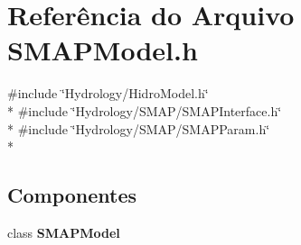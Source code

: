 \section{Referência do Arquivo S\+M\+A\+P\+Model.\+h}
\label{_s_m_a_p_model_8h}
{\ttfamily \#include \char`\"{}Hydrology/\+Hidro\+Model.\+h\char`\"{}}\\*
{\ttfamily \#include \char`\"{}Hydrology/\+S\+M\+A\+P/\+S\+M\+A\+P\+Interface.\+h\char`\"{}}\\*
{\ttfamily \#include \char`\"{}Hydrology/\+S\+M\+A\+P/\+S\+M\+A\+P\+Param.\+h\char`\"{}}\\*
\subsection*{Componentes}
\begin{DoxyCompactItemize}
\item 
class {\bf S\+M\+A\+P\+Model}
\end{DoxyCompactItemize}
